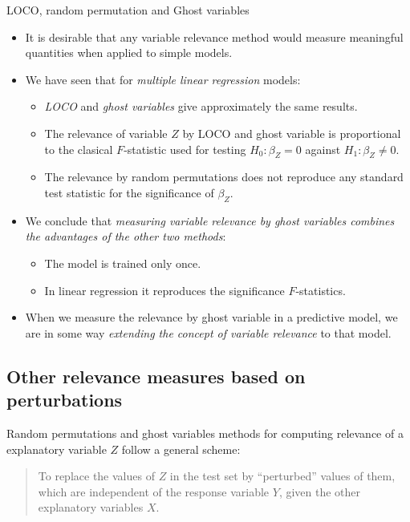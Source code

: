 \begin{recap}{LOCO, random permutation and Ghost variables}{}
	\begin{itemize}
		\item It is desirable that any variable relevance method would
		      measure meaningful quantities when applied to simple models.
		\item We have seen that for \emph{multiple linear regression}
		      models:
		      \begin{itemize}
			      \item \emph{LOCO} and \emph{ghost variables} give
			            approximately the same results.
			      \item The relevance of variable $Z$ by LOCO and ghost
			            variable is proportional to the clasical
			            $F$-statistic used for testing $H_0: \beta_Z = 0$
			            against $H_1: \beta_Z \neq 0$.
			      \item The relevance by random permutations does not
			            reproduce any standard test statistic for the
			            significance of $\beta_Z$.
		      \end{itemize}
		\item We conclude that \emph{measuring variable relevance by ghost
			      variables combines the advantages of the other two methods}:
		      \begin{itemize}
			      \item The model is trained only once.
			      \item In linear regression it reproduces the significance
			            $F$-statistics.
		      \end{itemize}
		\item When we measure the relevance by ghost variable in a
		      predictive model, we are in some way
		      \emph{extending the concept of variable relevance} to
		      that model.
	\end{itemize}
\end{recap}

\subsection{Other relevance measures based on perturbations}

Random permutations and ghost variables methods for computing
relevance of a explanatory variable $Z$ follow a general
scheme:
\begin{quote}
	To replace the values of $Z$ in the test set by ``perturbed'' values
	of them, which are independent of the response variable $Y$, given
	the other explanatory variables $X$.
\end{quote}

